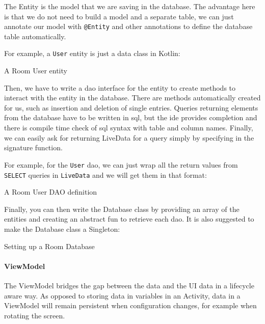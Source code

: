 \documentclass[twoside, openright,11pt,a4paper]{book}
\newenvironment{code}{\captionsetup{type=listing}}{}
\begin{document}
The Entity\cite{android:training:jetpack:room:entities} is the model that we are saving in the database. The advantage here is that we do not need to build a model and a separate table, we can just annotate our model with \texttt{@Entity} and other annotations to define the database table automatically.

For example, a \verb+User+ entity is just a data class in Kotlin:
\begin{code}
\caption{A Room User entity}	
\end{code}



Then, we have to write a \gls{dao}\cite{android:training:jetpack:room:dao} interface for the entity to create methods to interact with the entity in the database. There are methods automatically created for us, such as insertion and deletion of single entries. Queries returning elements from the database have to be written in \gls{sql}, but the \gls{ide} provides completion and there is compile time check of \gls{sql} syntax with table and column names. Finally, we can easily ask for returning LiveData for a query simply by specifying in the signature function.

For example, for the \verb+User+ \gls{dao}, we can just wrap all the return values from \verb+SELECT+ queries in \verb+LiveData+ and we will get them in that format:
\begin{code}
\caption{A Room User DAO definition}	
\end{code}


Finally, you can then write the Database\cite{android:training:jetpack:room:db} class by providing an array of the entities and creating an abstract fun to retrieve each \gls{dao}. It is also suggested to make the Database class a Singleton\cite{android:training:jetpack:room}:
\begin{code}
\caption{Setting up a Room Database}	
\end{code}
\paragraph{ViewModel}
The ViewModel\cite{android:doc:viewmodel} bridges the gap between the data and the UI data in a lifecycle aware way. As opposed to storing data in variables in an Activity, data in a ViewModel will remain persistent when configuration changes, for example when rotating the screen.
\end{document}
